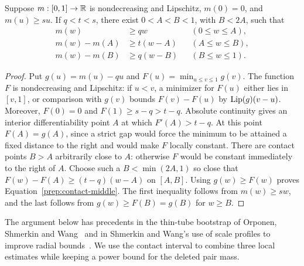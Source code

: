 \begin{lemma}\label{prep:contact}
Suppose $m:[0,1]\to\mathbb R$ is nondecreasing and Lipschitz,
$m(0)=0$, and $m(u)\ge su$. If $q<t<s$, there exist
$0<A<B<1$, with $B<2A$, such that
\begin{align}
 m(w)&\ge qw &&(0\le w\le A),\label{prep:contact-first}\\
 m(w)-m(A)&\ge t(w-A)&&(A\le w\le B),\label{prep:contact-middle}\\
 m(w)-m(B)&\ge q(w-B)&&(B\le w\le1).\label{prep:contact-last}
\end{align}
\end{lemma}
\begin{proof}
Put $g(u)=m(u)-qu$ and $F(u)=\min_{u\le v\le1}g(v)$.
The function $F$ is nondecreasing and Lipschitz: if $u<v$, a minimizer
for $F(u)$ either lies in $[v,1]$, or comparison with $g(v)$ bounds
$F(v)-F(u)$ by $\operatorname{Lip}(g)(v-u)$. Moreover, $F(0)=0$ and
$F(1)\ge s-q>t-q$. Absolute continuity gives an interior
differentiability point $A$ at which $F'(A)>t-q$.
At this point $F(A)=g(A)$, since a strict gap would force the minimum
to be attained a fixed distance to the right and would make $F$ locally
constant. There are contact points $B>A$ arbitrarily close to $A$:
otherwise $F$ would be constant immediately to the right of $A$.
Choose such a $B<\min(2A,1)$ so close that
$F(w)-F(A)\ge(t-q)(w-A)$ on $[A,B]$.
Using $g(w)\ge F(w)$ proves Equation~\eqref{prep:contact-middle}.
The first inequality follows from $m(w)\ge sw$, and the last follows
from $g(w)\ge F(B)=g(B)$ for $w\ge B$.
\end{proof}

The argument below has precedents in the thin-tube bootstrap of Orponen,
Shmerkin and Wang~\cite[Section~1.3 and Lemma~2.8]{OSW2024} and in
Shmerkin and Wang's use of scale profiles to improve radial
bounds~\cite[Section~5.5]{SW2025}. We use the contact interval to combine
three local estimates while keeping a power bound for the deleted pair mass.

